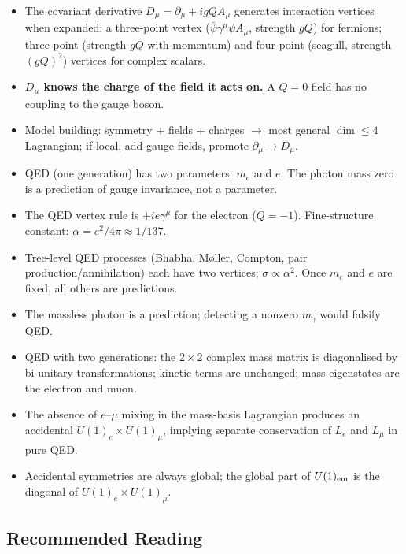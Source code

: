 \documentclass[../main.tex]{subfiles}
\begin{document}
\begin{itemize}
  \item The covariant derivative $D_\mu = \partial_\mu + igQA_\mu$ generates interaction vertices when expanded: a three-point vertex ($\bar\psi\gamma^\mu\psi A_\mu$, strength $gQ$) for fermions; three-point (strength $gQ$ with momentum) and four-point (seagull, strength $(gQ)^2$) vertices for complex scalars.
  \item \textbf{$D_\mu$ knows the charge of the field it acts on.}  A $Q=0$ field has no coupling to the gauge boson.
  \item Model building: symmetry + fields + charges $\to$ most general $\dim\leq4$ Lagrangian; if local, add gauge fields, promote $\partial_\mu\to D_\mu$.
  \item QED (one generation) has two parameters: $m_e$ and $e$.  The photon mass zero is a prediction of gauge invariance, not a parameter.
  \item The QED vertex rule is $+ie\gamma^\mu$ for the electron ($Q=-1$).  Fine-structure constant: $\alpha=e^2/4\pi\approx1/137$.
  \item Tree-level QED processes (Bhabha, M\o{}ller, Compton, pair production/annihilation) each have two vertices; $\sigma\propto\alpha^2$.  Once $m_e$ and $e$ are fixed, all others are predictions.
  \item The massless photon is a prediction; detecting a nonzero $m_\gamma$ would falsify QED.
  \item QED with two generations: the $2\times2$ complex mass matrix is diagonalised by bi-unitary transformations; kinetic terms are unchanged; mass eigenstates are the electron and muon.
  \item The absence of $e$--$\mu$ mixing in the mass-basis Lagrangian produces an accidental $U(1)_e\times U(1)_\mu$, implying separate conservation of $L_e$ and $L_\mu$ in pure QED.
  \item Accidental symmetries are always global; the global part of $U(1)_{\rm em}$ is the diagonal of $U(1)_e\times U(1)_\mu$.
\end{itemize}

\subsection*{Recommended Reading}
\end{document}
